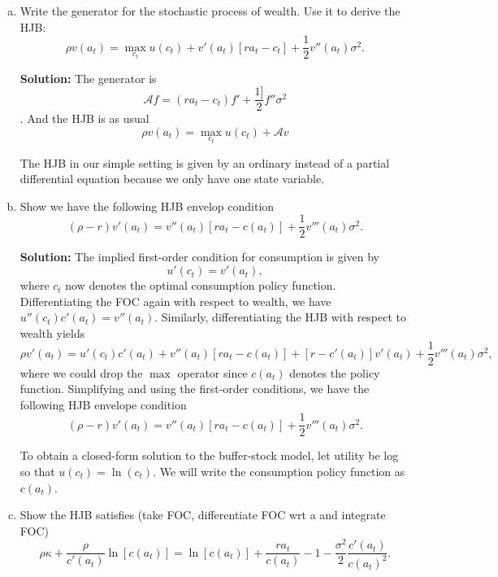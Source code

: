 \documentclass[11pt]{extarticle}
\theoremstyle{plain}
\theoremstyle{definition}
\begin{document}
\begin{enumerate}[(a)]

\item Write the generator for the stochastic process of wealth. Use it to derive the HJB:
\begin{equation}
	\rho v(a_t) = \max_{c_t} u(c_t) + v'(a_t) [ra_t - c_t] + \frac{1}{2} v''(a_t) \sigma^2.
\end{equation}

\textbf{Solution:} The generator is $$\mathcal A f = (ra_t-c_t)f'+\frac{1]}{2} f''\sigma^2$$. And the HJB is as usual
$$\rho v(a_t) = \max_{c_t} u(c_t) + \mathcal A v$$


The HJB in our simple setting is given by an ordinary instead of a partial differential equation because we only have one state variable. 
\item Show we have the following HJB envelop condition 
\begin{equation*}
	(\rho - r) v'(a_t) = v''(a_t) [ra_t - c(a_t)] + \frac{1}{2} v'''(a_t) \sigma^2.
\end{equation*}


\textbf{Solution:}
The implied first-order condition for consumption is given by
\begin{equation}
	u'(c_t) = v'(a_t),
\end{equation}
where $c_t$ now denotes the optimal consumption policy function. Differentiating the FOC again with respect to wealth, we have $u''(c_t) c'(a_t) = v''(a_t)$. Similarly, differentiating the HJB with respect to wealth yields 
\begin{equation*}
	\rho v'(a_t) = u'(c_t)c'(a_t) + v''(a_t) [ra_t - c(a_t)] + [r - c'(a_t)] v'(a_t) + \frac{1}{2} v'''(a_t) \sigma^2,
\end{equation*}
where we could drop the $\max$ operator since $c(a_t)$ denotes the policy function. Simplifying and using the first-order conditions, we have the following HJB envelope condition
\begin{equation*}
	(\rho - r) v'(a_t) = v''(a_t) [ra_t - c(a_t)] + \frac{1}{2} v'''(a_t) \sigma^2.
\end{equation*}


To obtain a closed-form solution to the buffer-stock model, let utility be log so that $u(c_t) = \ln(c_t)$. We will write the consumption policy function as $c(a_t)$. 
\item Show the HJB satisfies (take FOC, differentiate FOC wrt a and integrate FOC)
\begin{equation*}
	\rho \kappa + \frac{\rho}{c'(a_t)} \ln[c(a_t)] = \ln[c(a_t)] + \frac{r a_t}{c(a_t)} - 1 - \frac{\sigma^2}{2} \frac{c'(a_t)}{c(a_t)^2}.
\end{equation*}


\end{enumerate}
\end{document}
